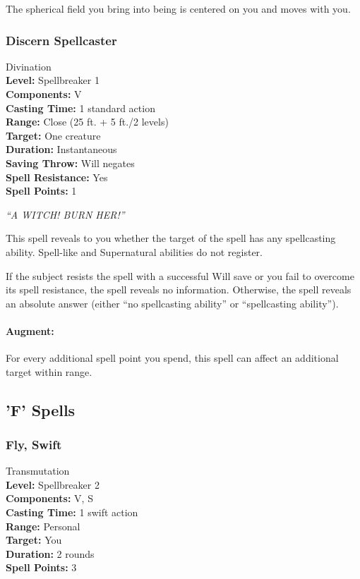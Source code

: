 The spherical field you bring into being is centered on you and moves with you.
\subsubsection{Discern Spellcaster}
\label{Spell:DiscernSpellcaster}
Divination
\\ \textbf{Level:} Spellbreaker 1
\\ \textbf{Components:} V
\\ \textbf{Casting Time:} 1 standard action
\\ \textbf{Range:} Close (25 ft. + 5 ft./2 levels)
\\ \textbf{Target:} One creature
\\ \textbf{Duration:} Instantaneous
\\ \textbf{Saving Throw:} Will negates
\\ \textbf{Spell Resistance:} Yes
\\ \textbf{Spell Points:} 1

\emph{``A WITCH! BURN HER!''}

This spell reveals to you whether the target of the spell has any spellcasting ability. Spell-like and Supernatural abilities do not register.

If the subject resists the spell with a successful Will save or you fail to overcome its spell resistance, the spell reveals no information. Otherwise, the spell reveals an absolute answer (either ``no spellcasting ability'' or ``spellcasting ability'').

\paragraph{Augment:} For every additional spell point you spend, this spell can affect an additional target within range.
\subsection{'F' Spells}
\subsubsection[Swift Fly]{Fly, Swift}
\label{Spell:SwiftFly}
Transmutation
\\ \textbf{Level:} Spellbreaker 2
\\ \textbf{Components:} V, S
\\ \textbf{Casting Time:} 1 swift action
\\ \textbf{Range:} Personal
\\ \textbf{Target:} You
\\ \textbf{Duration:} 2 rounds
\\ \textbf{Spell Points:} 3

